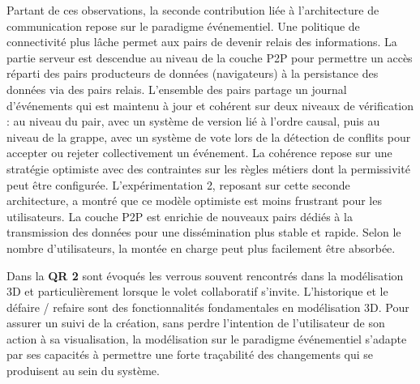 Partant de ces observations, la seconde contribution liée à l'architecture de 
communication repose sur le paradigme événementiel. Une politique de 
connectivité plus lâche permet aux pairs de devenir relais des informations. La 
partie serveur est \og descendue\fg{} au niveau de la couche \gls{P2P} pour 
permettre un accès réparti des pairs producteurs de données (navigateurs) à la
persistance des données via des pairs relais. L'ensemble des pairs partage un 
journal d'événements qui est maintenu à jour et cohérent sur deux niveaux de 
vérification : au niveau du pair, avec un système de version lié à l'ordre causal, 
puis au niveau de la grappe, avec un système de vote lors de la détection de 
conflits pour accepter ou rejeter collectivement un événement. La cohérence 
repose sur une stratégie optimiste avec des contraintes sur les règles métiers 
dont la permissivité peut être configurée.
L'expérimentation 2, reposant sur cette seconde architecture, a montré que ce 
modèle optimiste est moins frustrant pour les utilisateurs. La couche \gls{P2P} est 
enrichie de nouveaux pairs dédiés à la transmission des données pour 
une dissémination plus stable et rapide. Selon le nombre d'utilisateurs, la montée 
en charge peut plus facilement être absorbée.



Dans la \textbf{QR 2} sont évoqués les verrous souvent rencontrés dans la 
modélisation 3D et particulièrement lorsque le volet collaboratif s'invite. 
L'historique et le \og défaire / refaire\fg{} sont des fonctionnalités fondamentales en 
modélisation 3D. Pour assurer un suivi de la création, sans perdre l'intention de 
l'utilisateur de son action à sa visualisation, la modélisation sur le paradigme 
événementiel s'adapte par ses capacités à permettre une forte traçabilité des 
changements qui se produisent au sein du système. 

